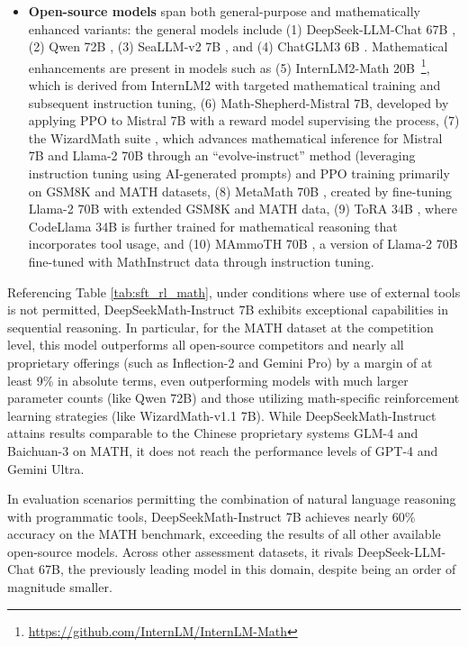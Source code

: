 \begin{itemize}[topsep=0pt]
These models are designed for broad application scenarios and typically undergo multiple rounds of alignment refinement.

\item \textbf{Open-source models} span both general-purpose and mathematically enhanced variants: the general models include (1) DeepSeek-LLM-Chat 67B \citep{deepseek-llm}, (2) Qwen 72B \citep{qwen}, (3) SeaLLM-v2 7B \citep{seallm}, and (4) ChatGLM3 6B \citep{chatglm3}. Mathematical enhancements are present in models such as (5) InternLM2-Math 20B~\footnote{\url{https://github.com/InternLM/InternLM-Math}}, which is derived from InternLM2 with targeted mathematical training and subsequent instruction tuning, (6) Math-Shepherd-Mistral 7B, developed by applying PPO \citep{schulman2017proximal} to Mistral 7B \citep{mistral} with a reward model supervising the process, (7) the WizardMath suite \citep{wizardmath}, which advances mathematical inference for Mistral 7B and Llama-2 70B \citep{llama2} through an “evolve-instruct” method (leveraging instruction tuning using AI-generated prompts) and PPO training primarily on GSM8K and MATH datasets, (8) MetaMath 70B \citep{metamath}, created by fine-tuning Llama-2 70B with extended GSM8K and MATH data, (9) ToRA 34B \cite{tora}, where CodeLlama 34B is further trained for mathematical reasoning that incorporates tool usage, and (10) MAmmoTH 70B \citep{MathInstruct}, a version of Llama-2 70B fine-tuned with MathInstruct data through instruction tuning.
\end{itemize}

Referencing Table \ref{tab:sft_rl_math}, under conditions where use of external tools is not permitted, DeepSeekMath-Instruct 7B exhibits exceptional capabilities in sequential reasoning. In particular, for the MATH dataset at the competition level, this model outperforms all open-source competitors and nearly all proprietary offerings (such as Inflection-2 and Gemini Pro) by a margin of at least 9\% in absolute terms, even outperforming models with much larger parameter counts (like Qwen 72B) and those utilizing math-specific reinforcement learning strategies (like WizardMath-v1.1 7B). While DeepSeekMath-Instruct attains results comparable to the Chinese proprietary systems GLM-4 and Baichuan-3 on MATH, it does not reach the performance levels of GPT-4 and Gemini Ultra.

In evaluation scenarios permitting the combination of natural language reasoning with programmatic tools, DeepSeekMath-Instruct 7B achieves nearly 60\% accuracy on the MATH benchmark, exceeding the results of all other available open-source models. Across other assessment datasets, it rivals DeepSeek-LLM-Chat 67B, the previously leading model in this domain, despite being an order of magnitude smaller.

